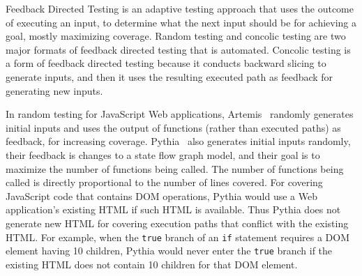 Feedback Directed Testing is an adaptive testing approach that uses the outcome of executing an input, to determine what the next input should be for achieving a goal, mostly maximizing coverage.  
Random testing and concolic testing are two major formats of feedback directed testing that is automated.  
Concolic testing is a form of feedback directed testing because it conducts backward slicing to generate inputs, and then it uses the resulting executed path as feedback for generating new inputs.  

In random testing for JavaScript Web applications, Artemis~\cite{artemis} randomly generates initial inputs and uses the output of functions (rather than executed paths) as feedback, for increasing coverage.  
Pythia~\cite{pythia} also generates initial inputs randomly, their feedback is changes to a state flow graph model, and their goal is to maximize the number of functions being called.  
The number of functions being called is directly proportional to the number of lines covered.  
For covering JavaScript code that contains DOM operations, Pythia would use a Web application's existing HTML if such HTML is available.  
Thus Pythia does not generate new HTML for covering execution paths that conflict with the existing HTML.  
For example, when the {\tt true} branch of an {\tt if} statement requires a DOM element having 10 children, 
Pythia would never enter the {\tt true} branch if the existing HTML does not contain 10 children for that DOM element.


